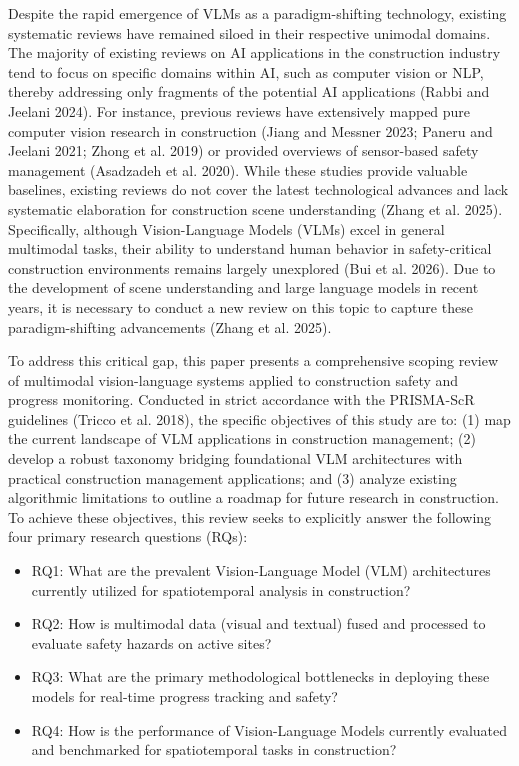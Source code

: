 \documentclass[10pt]{article}
\begin{document}
Despite the rapid emergence of VLMs as a paradigm-shifting technology, existing systematic reviews have remained siloed in their respective unimodal domains. The majority of existing reviews on AI applications in the construction industry tend to focus on specific domains within AI, such as computer vision or NLP, thereby addressing only fragments of the potential AI applications (Rabbi and Jeelani 2024). For instance, previous reviews have extensively mapped pure computer vision research in construction (Jiang and Messner 2023; Paneru and Jeelani 2021; Zhong et al. 2019) or provided overviews of sensor-based safety management (Asadzadeh et al. 2020). While these studies provide valuable baselines, existing reviews do not cover the latest technological advances and lack systematic elaboration for construction scene understanding (Zhang et al. 2025). Specifically, although Vision-Language Models (VLMs) excel in general multimodal tasks, their ability to understand human behavior in safety-critical construction environments remains largely unexplored (Bui et al. 2026). Due to the development of scene understanding and large language models in recent years, it is necessary to conduct a new review on this topic to capture these paradigm-shifting advancements (Zhang et al. 2025).

To address this critical gap, this paper presents a comprehensive scoping review of multimodal vision-language systems applied to construction safety and progress monitoring. Conducted in strict accordance with the PRISMA-ScR guidelines (Tricco et al. 2018), the specific objectives of this study are to: (1) map the current landscape of VLM applications in construction management; (2) develop a robust taxonomy bridging foundational VLM architectures with practical construction management applications; and (3) analyze existing algorithmic limitations to outline a roadmap for future research in construction. To achieve these objectives, this review seeks to explicitly answer the following four primary research questions (RQs):

\begin{itemize}
\item RQ1: What are the prevalent Vision-Language Model (VLM) architectures currently utilized for spatiotemporal analysis in construction?
\item RQ2: How is multimodal data (visual and textual) fused and processed to evaluate safety hazards on active sites?
\item RQ3: What are the primary methodological bottlenecks in deploying these models for real-time progress tracking and safety?
\item RQ4: How is the performance of Vision-Language Models currently evaluated and benchmarked for spatiotemporal tasks in construction?
\end{itemize}
\end{document}
